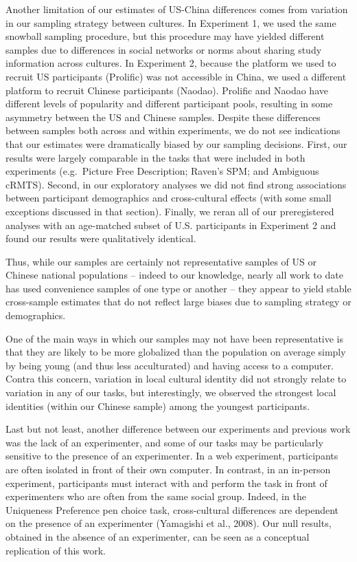 \documentclass[
  man,floatsintext]{apa6}
\begin{document}
Another limitation of our estimates of US-China differences comes from variation in our sampling strategy between cultures. In Experiment 1, we used the same snowball sampling procedure, but this procedure may have yielded different samples due to differences in social networks or norms about sharing study information across cultures. In Experiment 2, because the platform we used to recruit US participants (Prolific) was not accessible in China, we used a different platform to recruit Chinese participants (Naodao). Prolific and Naodao have different levels of popularity and different participant pools, resulting in some asymmetry between the US and Chinese samples. Despite these differences between samples both across and within experiments, we do not see indications that our estimates were dramatically biased by our sampling decisions. First, our results were largely comparable in the tasks that were included in both experiments (e.g.~Picture Free Description; Raven's SPM; and Ambiguous cRMTS). Second, in our exploratory analyses we did not find strong associations between participant demographics and cross-cultural effects (with some small exceptions discussed in that section). Finally, we reran all of our preregistered analyses with an age-matched subset of U.S. participants in Experiment 2 and found our results were qualitatively identical.

Thus, while our samples are certainly not representative samples of US or Chinese national populations -- indeed to our knowledge, nearly all work to date has used convenience samples of one type or another -- they appear to yield stable cross-sample estimates that do not reflect large biases due to sampling strategy or demographics.

One of the main ways in which our samples may not have been representative is that they are likely to be more globalized than the population on average simply by being young (and thus less acculturated) and having access to a computer. Contra this concern, variation in local cultural identity did not strongly relate to variation in any of our tasks, but interestingly, we observed the strongest local identities (within our Chinese sample) among the youngest participants.

Last but not least, another difference between our experiments and previous work was the lack of an experimenter, and some of our tasks may be particularly sensitive to the presence of an experimenter. In a web experiment, participants are often isolated in front of their own computer. In contrast, in an in-person experiment, participants must interact with and perform the task in front of experimenters who are often from the same social group. Indeed, in the Uniqueness Preference pen choice task, cross-cultural differences are dependent on the presence of an experimenter (Yamagishi et al., 2008). Our null results, obtained in the absence of an experimenter, can be seen as a conceptual replication of this work.
\end{document}
